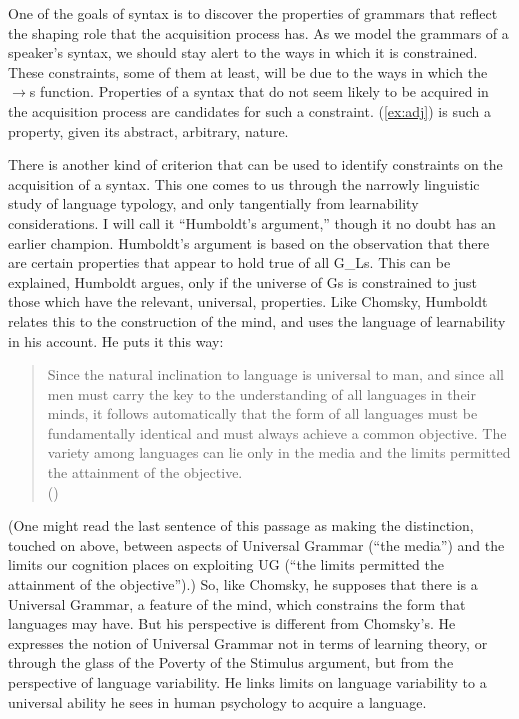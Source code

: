 One of the goals of syntax is to discover the properties of grammars that reflect the shaping role that the acquisition process has. As we model the grammars of a speaker's syntax, we should stay alert to the ways in which it is constrained. These constraints, some of them at least, will be due to the ways in which the $\longrightarrow$s function. Properties of a syntax that do not seem likely to be acquired in the acquisition process are candidates for such a constraint. (\ref{ex:adj}) is such a property, given its abstract, arbitrary, nature.

There is another kind of criterion that can be used to identify constraints on the acquisition of a syntax. This one comes to us through the narrowly linguistic study of language typology, and only tangentially from learnability considerations. I will call it ``Humboldt's argument,'' though it no doubt has an earlier champion. Humboldt's argument is based on the observation that there are certain properties that appear to hold true of all G_Ls. This can be explained, Humboldt argues, only if the universe of Gs is constrained to just those which have the relevant, universal, properties. Like Chomsky, Humboldt relates this to the construction of the mind, and uses the language of learnability in his account. He puts it this way:
     \begin{quote}
     	Since the natural inclination to language is universal to man, and since all men must carry the key to the understanding of all languages in their minds, it follows automatically that the form of all languages must be fundamentally identical and must always achieve a common objective. The variety among languages can lie only in the media and the limits permitted the attainment of the objective.\\ 
          \hspace*{2in} (\citealt{Humboldt:1836})                                                          
       \end{quote}
(One might read the last sentence of this passage as making the distinction, touched on above, between aspects of Universal Grammar (``the media'') and the limits our cognition places on exploiting UG (``the limits permitted the attainment of the objective'').) So, like Chomsky, he supposes that there is a Universal Grammar, a feature of the mind, which constrains the form that languages may have. But his perspective is different from Chomsky's. He expresses the notion of Universal Grammar not in terms of learning theory, or through the glass of the Poverty of the Stimulus argument, but from the perspective of language variability. He links limits on language variability to a universal ability he sees in human psychology to acquire a language.

